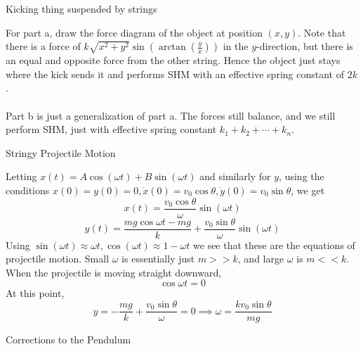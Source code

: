 \documentclass[11pt]{scrartcl}
\begin{document}
\begin{example}
  [4.20]
  Kicking thing suspended by strings
\end{example}
\begin{soln}
  For part a, draw the force diagram of the object at position $(x,y)$. Note that
  there is a force of $k\sqrt{x^2+y^2}\sin\left(\arctan\left(\frac{y}{x}\right)\right)$
  in the $y$-direction, but there is an equal and opposite force from the other string.
  Hence the object just stays where the kick sends it and performs SHM with an effective spring
  constant of $2k$. \\ \\
  Part b is just a generalization of part a. The forces still balance,
  and we still perform SHM, just with effective spring constant $k_1+k_2+\cdots+k_n$.
\end{soln}
\begin{example}
  [4.22]
  Stringy Projectile Motion
\end{example}
Letting $x(t)=A\cos(\omega t)+B\sin(\omega t)$ and similarly for $y$, using the
conditions $x(0)=y(0)=0, \dot{x}(0)=v_0\cos\theta, \dot{y}(0)=v_0\sin\theta$,
we get
$$x(t)=\frac{v_0\cos\theta}{\omega}\sin(\omega t)$$
$$y(t)=\frac{mg\cos\omega t-mg}{k}+\frac{v_0\sin\theta}{\omega}\sin(\omega t)$$
Using $\sin(\omega t)\approx \omega t, \cos(\omega t)\approx 1-\omega t$
we see that these are the equations of projectile motion. Small $\omega$ is
essentially just $m>>k$, and large $\omega$ is $m<<k$. When the projectile
is moving straight downward,
$$\cos\omega t = 0$$
At this point,
$$y=-\frac{mg}{k}+\frac{v_0\sin\theta}{\omega}=0\implies \omega=\frac{kv_0\sin\theta}{mg}$$
\begin{example}
  [4.23]
  Corrections to the Pendulum
\end{example}
\end{document}
